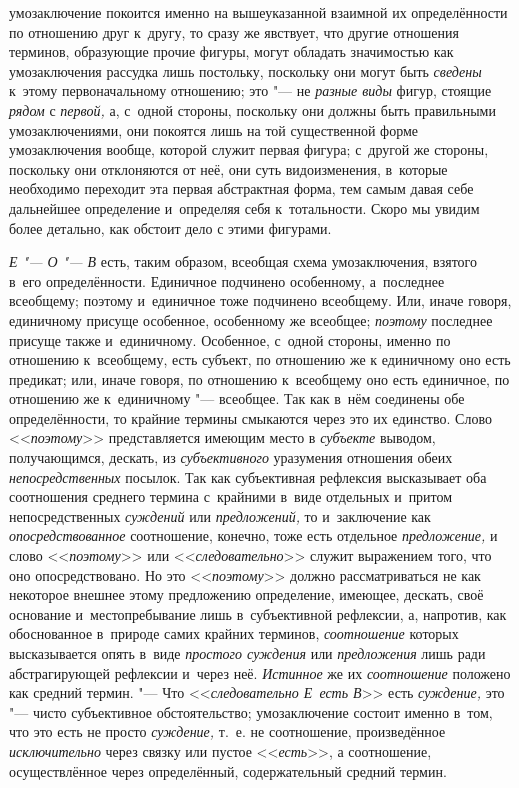 умозаключение покоится именно на вышеуказанной взаимной их определённости
по отношению друг к~другу, то сразу же явствует, что другие отношения
терминов, образующие прочие фигуры, могут обладать значимостью как
умозаключения рассудка лишь постольку, поскольку они могут быть
{\em сведены} к~этому
первоначальному отношению; это "--- не
{\em разные виды} фигур,
стоящие {\em рядом} с
{\em первой,} а, с~одной
стороны, поскольку они должны быть правильными умозаключениями, они
покоятся лишь на той существенной форме умозаключения вообще, которой
служит первая фигура; с~другой же стороны, поскольку они отклоняются от
неё, они суть видоизменения, в~которые необходимо переходит эта первая
абстрактная форма, тем самым давая себе дальнейшее определение и~определяя
себя к~тотальности. Скоро мы увидим более детально, как обстоит дело с
этими фигурами.

{\em Е "--- О "--- В} есть, таким образом, всеобщая схема
умозаключения, взятого в~его определённости. Единичное подчинено
особенному, а~последнее всеобщему; поэтому и~единичное тоже подчинено
всеобщему. Или, иначе говоря, единичному присуще особенное, особенному же
всеобщее; {\em поэтому}
последнее присуще также и~единичному. Особенное, с~одной
стороны, именно по отношению к~всеобщему, есть субъект, по отношению же к
единичному оно есть предикат; или, иначе говоря, по отношению к~всеобщему
оно есть единичное, по отношению же к~единичному "--- всеобщее.
Так как в~нём соединены обе определённости, то крайние термины смыкаются
через это их единство. Слово
<<{\em поэтому}>>
представляется имеющим место в
{\em субъекте} выводом,
получающимся, дескать, из
{\em субъективного}
уразумения отношения обеих
{\em непосредственных}
посылок. Так как субъективная рефлексия высказывает оба
соотношения среднего термина с~крайними в~виде отдельных и~притом
непосредственных {\em суждений}
или {\em предложений,}
то и~заключение как
{\em опосредствованное}
соотношение, конечно, тоже есть отдельное
{\em предложение,} и
слово <<{\em поэтому}>> или
<<{\em следовательно}>>
служит выражением того, что оно опосредствовано. Но это
<<{\em поэтому}>> должно
рассматриваться не как некоторое внешнее этому предложению определение,
имеющее, дескать, своё основание и~местопребывание лишь в~субъективной
рефлексии, а, напротив, как обоснованное в~природе самих крайних терминов,
{\em соотношение} которых
высказывается опять в~виде {\em простого
суждения} или
{\em предложения} лишь
ради абстрагирующей рефлексии и~через неё.
{\em Истинное} же их
{\em соотношение}
положено как средний термин. "--- Что
<<{\em следовательно Е~есть В}>>
есть {\em суждение,}
это "--- чисто субъективное обстоятельство;
умозаключение состоит именно в~том, что это есть не просто
{\em суждение,} т.~е. не
соотношение, произведённое
{\em исключительно} через
связку или пустое <<{\em есть}>>,
а соотношение, осуществлённое через определённый,
содержательный средний термин.

